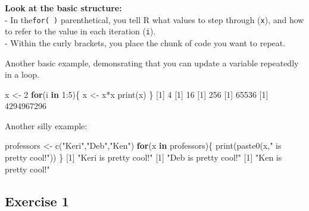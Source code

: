 \documentclass[
]{book}
\newenvironment{Shaded}{\begin{snugshade}}{\end{snugshade}}
\newcommand{\ControlFlowTok}[1]{\textcolor[rgb]{0.13,0.29,0.53}{\textbf{#1}}}
\newcommand{\DecValTok}[1]{\textcolor[rgb]{0.00,0.00,0.81}{#1}}
\newcommand{\FunctionTok}[1]{\textcolor[rgb]{0.00,0.00,0.00}{#1}}
\newcommand{\NormalTok}[1]{#1}
\newcommand{\OtherTok}[1]{\textcolor[rgb]{0.56,0.35,0.01}{#1}}
\newcommand{\SpecialCharTok}[1]{\textcolor[rgb]{0.00,0.00,0.00}{#1}}
\newcommand{\StringTok}[1]{\textcolor[rgb]{0.31,0.60,0.02}{#1}}
\begin{document}
\textbf{Look at the basic structure:}\\
- In the\texttt{for(\ )} parenthetical, you tell R what values to step through (\texttt{x}), and how to refer to the value in each iteration (\texttt{i}).\\
- Within the curly brackets, you place the chunk of code you want to repeat.

Another basic example, demonsrating that you can update a variable repeatedly in a loop.

\begin{Shaded}
\begin{Highlighting}[]
\NormalTok{x }\OtherTok{\textless{}{-}} \DecValTok{2}
\ControlFlowTok{for}\NormalTok{(i }\ControlFlowTok{in} \DecValTok{1}\SpecialCharTok{:}\DecValTok{5}\NormalTok{)\{}
\NormalTok{  x }\OtherTok{\textless{}{-}}\NormalTok{ x}\SpecialCharTok{*}\NormalTok{x}
  \FunctionTok{print}\NormalTok{(x)}
\NormalTok{\}}
\NormalTok{[}\DecValTok{1}\NormalTok{] }\DecValTok{4}
\NormalTok{[}\DecValTok{1}\NormalTok{] }\DecValTok{16}
\NormalTok{[}\DecValTok{1}\NormalTok{] }\DecValTok{256}
\NormalTok{[}\DecValTok{1}\NormalTok{] }\DecValTok{65536}
\NormalTok{[}\DecValTok{1}\NormalTok{] }\DecValTok{4294967296}
\end{Highlighting}
\end{Shaded}

Another silly example:

\begin{Shaded}
\begin{Highlighting}[]
\NormalTok{professors }\OtherTok{\textless{}{-}} \FunctionTok{c}\NormalTok{(}\StringTok{"Keri"}\NormalTok{,}\StringTok{"Deb"}\NormalTok{,}\StringTok{"Ken"}\NormalTok{) }
\ControlFlowTok{for}\NormalTok{(x }\ControlFlowTok{in}\NormalTok{ professors)\{}
  \FunctionTok{print}\NormalTok{(}\FunctionTok{paste0}\NormalTok{(x,}\StringTok{" is pretty cool!"}\NormalTok{))}
\NormalTok{\}}
\NormalTok{[}\DecValTok{1}\NormalTok{] }\StringTok{"Keri is pretty cool!"}
\NormalTok{[}\DecValTok{1}\NormalTok{] }\StringTok{"Deb is pretty cool!"}
\NormalTok{[}\DecValTok{1}\NormalTok{] }\StringTok{"Ken is pretty cool!"}
\end{Highlighting}
\end{Shaded}

\hypertarget{exercise-1-6}{%
\subsection*{Exercise 1}\label{exercise-1-6}}
\end{document}
